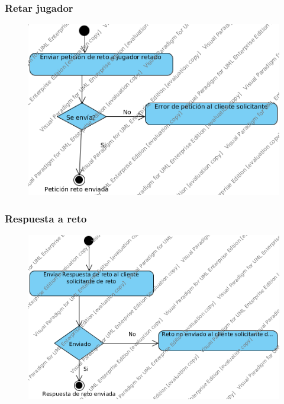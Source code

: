 \subsubsection{Retar jugador}
 \begin{figure}[h]
 \centering
 \includegraphics[scale=0.5]{img/ms_RetarJugadorServidor.png}
 \end{figure}
 \clearpage
\subsubsection{Respuesta a reto}
 \begin{figure}[h]
 \centering
 \includegraphics[scale=0.5]{img/ms_RespuestaRetoServidor.png}
 \end{figure}
 